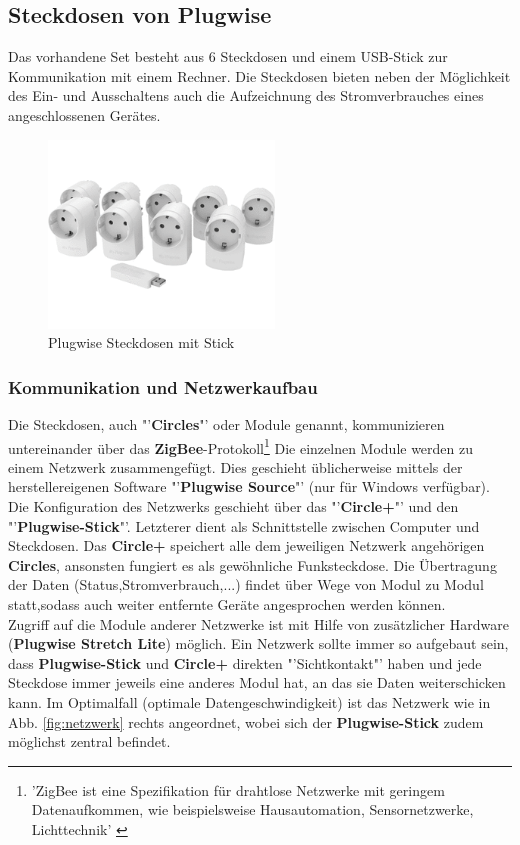 \subsection{Steckdosen von Plugwise}

Das vorhandene Set besteht aus 6 Steckdosen und einem USB-Stick zur Kommunikation mit einem Rechner. Die Steckdosen bieten neben der Möglichkeit des Ein- und Ausschaltens auch die Aufzeichnung des Stromverbrauches eines angeschlossenen Gerätes. 

\begin{figure}[h!]
	\centering
	\includegraphics[width=6cm]{Bilder/pwsteckdosen.png}
	\caption{Plugwise Steckdosen mit Stick}
\end{figure}

\subsubsection{Kommunikation und Netzwerkaufbau} 

Die Steckdosen, auch "'\textbf{Circles}"' oder Module genannt, kommunizieren untereinander über das \textbf{ZigBee}-Protokoll\footnote{'ZigBee ist eine Spezifikation für drahtlose Netzwerke mit geringem Datenaufkommen, wie beispielsweise Hausautomation, Sensornetzwerke, Lichttechnik' \cite{c1}} %
Die einzelnen Module werden zu einem Netzwerk zusammengefügt. Dies geschieht üblicherweise mittels der herstellereigenen Software "'\textbf{Plugwise Source}"' (nur für Windows verfügbar). Die Konfiguration des Netzwerks geschieht über das "'\textbf{Circle+}"' und den "'\textbf{Plugwise-Stick}"'. Letzterer dient als Schnittstelle zwischen Computer und Steckdosen. Das \textbf{Circle+} speichert alle dem jeweiligen Netzwerk angehörigen \textbf{Circles}, ansonsten fungiert es als gewöhnliche Funksteckdose. \newline
Die Übertragung der Daten (Status,Stromverbrauch,...) findet über Wege von Modul zu Modul statt,sodass auch weiter entfernte Geräte angesprochen werden können.\\
Zugriff auf die Module anderer Netzwerke ist mit Hilfe von zusätzlicher Hardware \\ (\textbf{Plugwise Stretch Lite}) möglich. \newline
Ein Netzwerk sollte immer so aufgebaut sein, dass \textbf{Plugwise-Stick} und \textbf{Circle+} direkten "'Sichtkontakt"' haben und jede Steckdose immer jeweils eine anderes Modul hat, an das sie Daten weiterschicken kann. Im Optimalfall (optimale Datengeschwindigkeit) ist das Netzwerk wie in Abb. \ref{fig:netzwerk} rechts angeordnet, wobei sich der \textbf{Plugwise-Stick} zudem möglichst zentral befindet.

